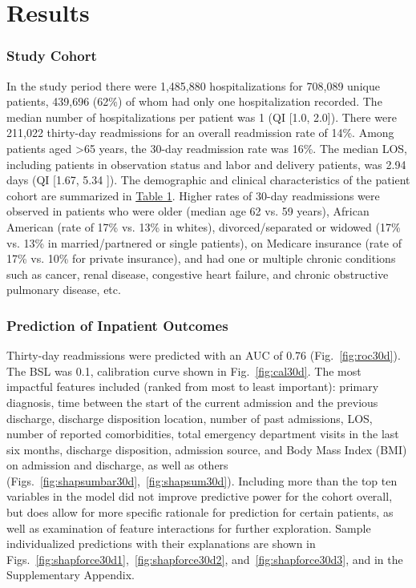 \section{Results}
\subsubsection{Study Cohort}
% 
In the study period there were 1,485,880 hospitalizations 
for 708,089 unique patients, 439,696 (62\%) of whom had only one hospitalization recorded. 
The median number of hospitalizations per patient was 1 (QI [1.0, 2.0]). 
There were 211,022 thirty-day readmissions for an overall readmission rate of 14\%. 
Among patients aged >65 years, the 30-day readmission rate was 16\%. 
The median LOS, including patients in observation status and labor and delivery patients, 
was 2.94 days (QI [1.67, 5.34 ]). 
The demographic and clinical characteristics of the patient cohort are summarized in \hyperref[table:table1]{Table 1}. 
Higher rates of 30-day readmissions were observed in patients who were 
older (median age 62 vs. 59 years), African American (rate of 17\% vs. 13\% in whites), 
divorced/separated or widowed (17\% vs. 13\% in married/partnered or single patients), 
on Medicare insurance (rate of 17\% vs. 10\% for private insurance), 
and had one or multiple chronic conditions such as 
cancer, renal disease, congestive heart failure, and chronic obstructive pulmonary disease, etc.\ %

\subsubsection{Prediction of Inpatient Outcomes}
Thirty-day readmissions were predicted with an AUC of 0.76 (Fig.\ \ref{fig:roc30d}).\@
The BSL was 0.1, calibration curve shown in Fig.\ \ref{fig:cal30d}.\@
The most impactful features included (ranked from most to least important): 
primary diagnosis, time between the start of the current admission and the previous discharge, 
discharge disposition location, number of past admissions, LOS, number of reported comorbidities, 
total emergency department visits in the last six months, discharge disposition,
admission source, and Body Mass Index (BMI) on admission and discharge, 
as well as others (Figs.\ \ref{fig:shapsumbar30d},~\ref{fig:shapsum30d}).\@
Including more than the top ten variables in the model did not improve predictive power for the cohort overall, 
but does allow for more specific rationale for prediction for certain patients, as well as 
examination of feature interactions for further exploration.\@
Sample individualized predictions with their explanations are shown in 
Figs.\ \ref{fig:shapforce30d1},~\ref{fig:shapforce30d2}, and~\ref{fig:shapforce30d3},
and in the Supplementary Appendix.\@

